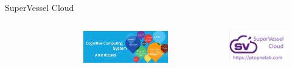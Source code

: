 \documentclass[final,hyperref={pdfpagelabels=false}]{beamer}
\begin{document}
\begin{frame}[t]
\begin{columns}[t]
\begin{column}{.445\textwidth}
\begin{block}{SuperVessel Cloud}
\begin{columns} %
\begin{column}{.3\textwidth} 
	\begin{figure}
		\includegraphics[width=0.7\linewidth]{ibm.png}
		\label{sv}
	\end{figure}
\end{column}
\begin{column}{.3\textwidth} 
	\begin{figure}
		\includegraphics[width=1.0\linewidth]{svcloud.png}
		\label{sv}
	\end{figure}
\end{column}
\begin{column}{.3\textwidth} 
	\begin{figure}
		\includegraphics[width=0.7\linewidth]{svlogo.png}
		\label{svl}
	\end{figure}
\end{column}
\end{columns}


\end{block}
\end{column}
\end{columns}
\end{frame}
\end{document}
